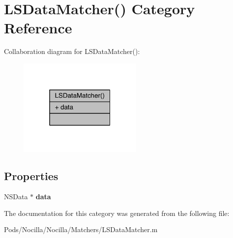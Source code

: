\hypertarget{category_l_s_data_matcher_07_08}{\section{L\-S\-Data\-Matcher() Category Reference}
\label{category_l_s_data_matcher_07_08}
}


Collaboration diagram for L\-S\-Data\-Matcher()\-:\nopagebreak
\begin{figure}[H]
\begin{center}
\leavevmode
\includegraphics[width=172pt]{category_l_s_data_matcher_07_08__coll__graph}
\end{center}
\end{figure}
\subsection*{Properties}
\begin{DoxyCompactItemize}
\item 
\hypertarget{category_l_s_data_matcher_07_08_a504bb15cd0b4ab8c4ae944a0cccc3d8f}{N\-S\-Data $\ast$ {\bfseries data}}\label{category_l_s_data_matcher_07_08_a504bb15cd0b4ab8c4ae944a0cccc3d8f}

\end{DoxyCompactItemize}


The documentation for this category was generated from the following file\-:\begin{DoxyCompactItemize}
\item 
Pods/\-Nocilla/\-Nocilla/\-Matchers/L\-S\-Data\-Matcher.\-m\end{DoxyCompactItemize}
